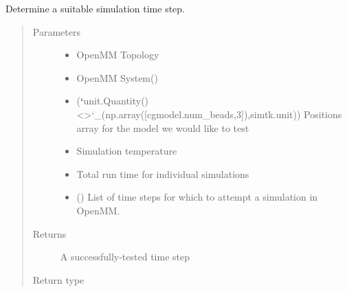 \documentclass[letterpaper,12pt,english,openany,oneside]{sphinxmanual}
\begin{document}
\begin{fulllineitems}
\label{\detokenize{simulation:simulation.tools.get_simulation_time_step}}
Determine a suitable simulation time step.
\begin{quote}\begin{description}
\item[{Parameters}] \leavevmode\begin{itemize}
\item {} 
 \textendash{} OpenMM Topology

\item {} 
 \textendash{} OpenMM System()

\item {} 
 ({\color{red}\bfseries{}{}`}unit.Quantity() \textless{}\textgreater{}{}`\_(np.array({[}cgmodel.num\_beads,3{]}),simtk.unit)) \textendash{} Positions array for the model we would like to test

\item {} 
 \textendash{} Simulation temperature

\item {} 
 \textendash{} Total run time for individual simulations

\item {} 
 (\sphinxstyleliteralemphasis{\sphinxupquote{, }}) \textendash{} List of time steps for which to attempt a simulation in OpenMM.

\end{itemize}

\item[{Returns}] \leavevmode
A successfully-tested time step

\item[{Return type}] \leavevmode


\end{description}
\end{quote}
\end{fulllineitems}
\end{document}
